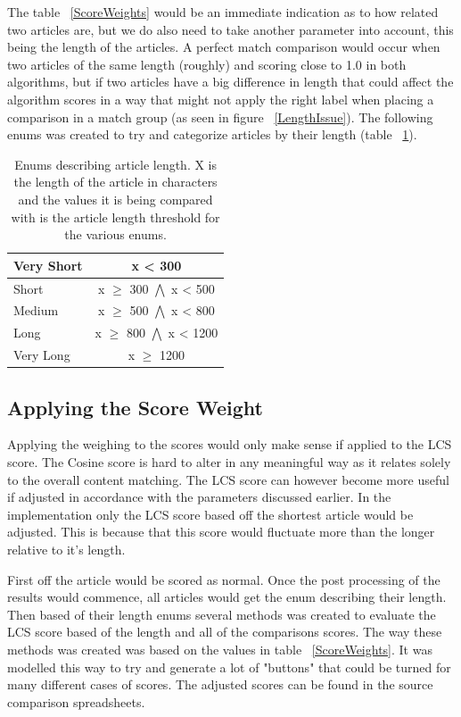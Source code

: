 The table ~\ref{ScoreWeights} would be an immediate indication as to how related two articles are, but we do also need to take another parameter into account, this being the length of the articles. A perfect match comparison would occur when two articles of the same length (roughly) and scoring close to 1.0 in both algorithms, but if two articles have a big difference in length that could affect the algorithm scores in a way that might not apply the right label when placing a comparison in a match group (as seen in figure ~\ref{LengthIssue}). The following enums was created to try and categorize articles by their length (table ~\ref{enums}).

\begin{table}
\begin{center}
	\begin{tabular}{l | c}
	Very Short & x < 300\\ \hline
	Short & x $\geq$ 300 $\bigwedge$ x < 500\\ \hline
	Medium & x $\geq$ 500 $\bigwedge$ x < 800\\ \hline
	Long & x $\geq$ 800 $\bigwedge$ x < 1200\\ \hline
	Very Long & x $\geq$ 1200\\ \hline
	\end{tabular}
\end{center}
\caption{Enums describing article length. X is the length of the article in characters and the values it is being compared with is the article length threshold for the various enums.}
	\label{enums}
\end{table}

\subsection{Applying the Score Weight}
Applying the weighing to the scores would only make sense if applied to the LCS score. The Cosine score is hard to alter in any meaningful way as it relates solely to the overall content matching. The LCS score can however become more useful if adjusted in accordance with the parameters discussed earlier. In the implementation only the LCS score based off the shortest article would be adjusted. This is because that this score would fluctuate more than the longer relative to it's length.

First off the article would be scored as normal. Once the post processing of the results would commence, all articles would get the enum describing their length. Then based of their length enums several methods was created to evaluate the LCS score based of the length and all of the comparisons scores. The way these methods was created was based on the values in table ~\ref{ScoreWeights}. It was modelled  this way to try and generate a lot of "buttons" that could be turned for many different cases of scores. The adjusted scores can be found in the source comparison spreadsheets.

